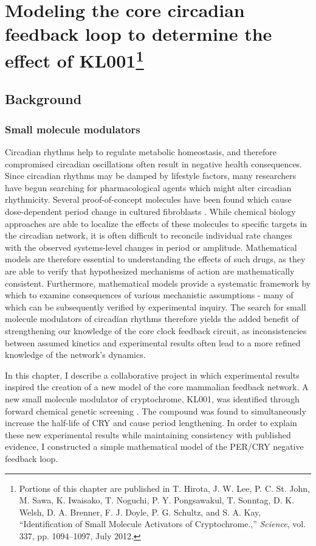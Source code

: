 \chapter[Modeling the core circadian feedback loop to determine the effect of KL001]{Modeling the core circadian feedback loop to determine the effect of KL001\footnote{ Portions of this chapter are published in T. Hirota, J. W. Lee, P. C. St. John, M. Sawa, K. Iwaisako, T. Noguchi, P. Y. Pongsawakul, T. Sonntag, D. K. Welsh, D. A. Brenner, F. J. Doyle, P. G. Schultz, and S. A. Kay, ``Identification of Small Molecule Activators of Cryptochrome.,'' {\itshape Science}, vol. 337, pp. 1094–1097, July 2012.}}\label{chap:model}

\section{Background}

\subsection{Small molecule modulators}
Circadian rhythms help to regulate metabolic homeostasis, and therefore compromised circadian oscillations often result in negative health consequences.
Since circadian rhythms may be damped by lifestyle factors, many researchers have begun searching for pharmacological agents which might alter circadian rhythmicity.
Several proof-of-concept molecules have been found which cause dose-dependent period change in cultured fibroblasts \cite{Chen2013}.
While chemical biology approaches are able to localize the effects of these molecules to specific targets in the circadian network, it is often difficult to reconcile individual rate changes with the observed systems-level changes in period or amplitude.
Mathematical models are therefore essential to understanding the effects of such drugs, as they are able to verify that hypothesized mechanisms of action are mathematically consistent.
Furthermore, mathematical models provide a systematic framework by which to examine consequences of various mechanistic assumptions - many of which can be subsequently verified by experimental inquiry.
The search for small molecule modulators of circadian rhythms therefore yields the added benefit of strengthening our knowledge of the core clock feedback circuit, as inconsistencies between assumed kinetics and experimental results often lead to a more refined knowledge of the network's dynamics.

In this chapter, I describe a collaborative project in which experimental results inspired the creation of a new model of the core mammalian feedback network.
A new small molecule modulator of cryptochrome, KL001, was identified through forward chemical genetic screening \cite{Hirota2012}.
The compound was found to simultaneously increase the half-life of CRY and cause period lengthening.
In order to explain these new experimental results while maintaining consistency with published evidence, I constructed a simple mathematical model of the PER/CRY negative feedback loop.

